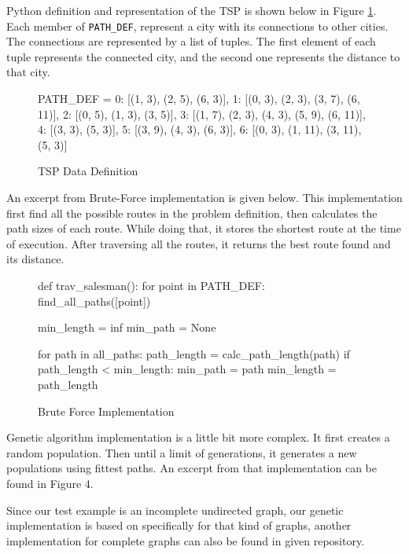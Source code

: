 \documentclass[journal,transmag]{IEEEtran}
\begin{document}
    Python definition and representation of the TSP is shown below in Figure
    \ref{fig:data-definition}. Each member of \texttt{PATH\_DEF}, represent a city
    with its connections to other cities. The connections are represented by a
    list of tuples. The first element of each tuple represents the connected
    city, and the second one represents the distance to that city.


    \begin{figure}[H]
        \begin{python}
PATH_DEF = {
    0: [(1, 3), (2, 5), (6, 3)],
    1: [(0, 3), (2, 3), (3, 7), (6, 11)],
    2: [(0, 5), (1, 3), (3, 5)],
    3: [(1, 7), (2, 3), (4, 3), (5, 9), (6, 11)],
    4: [(3, 3), (5, 3)],
    5: [(3, 9), (4, 3), (6, 3)],
    6: [(0, 3), (1, 11), (3, 11), (5, 3)]
}
        \end{python}
        \caption{TSP Data Definition}
        \label{fig:data-definition}
    \end{figure}

    An excerpt from Brute-Force implementation is given below. This
    implementation first find all the possible routes in the problem definition,
    then calculates the path sizes of each route. While doing that, it stores
    the shortest route at the time of execution. After traversing all the
    routes, it returns the best route found and its distance.
    \begin{figure}[H]
        \begin{python}
def trav_salesman():
    for point in PATH_DEF:
        find_all_paths([point])

    min_length = inf
    min_path = None

    for path in all_paths:
        path_length = calc_path_length(path)
        if path_length < min_length:
            min_path = path
            min_length = path_length
        \end{python}
        \caption{Brute Force Implementation}
    \end{figure}

    Genetic algorithm implementation is a little bit more complex. It first
    creates a random population. Then until a limit of generations, it generates
    a new populations using fittest paths. An excerpt from that implementation
    can be found in Figure 4.

    Since our test example is an incomplete undirected graph, our genetic implementation
    is based on specifically for that kind of graphs, another implementation for
    complete graphs can also be found in given repository. \cite{code_repository}
\end{document}
